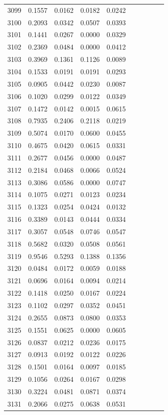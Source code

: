 \begin{table}
\begin{tabular}{cccccccccc}
3099& 0.1557& 0.0162& 0.0182& 0.0242\\ 
3100& 0.2093& 0.0342& 0.0507& 0.0393\\ 
3101& 0.1441& 0.0267& 0.0000& 0.0329\\ 
3102& 0.2369& 0.0484& 0.0000& 0.0412\\ 
3103& 0.3969& 0.1361& 0.1126& 0.0089\\ 
3104& 0.1533& 0.0191& 0.0191& 0.0293\\ 
3105& 0.0905& 0.0442& 0.0230& 0.0087\\ 
3106& 0.1020& 0.0299& 0.0122& 0.0349\\ 
3107& 0.1472& 0.0142& 0.0015& 0.0615\\ 
3108& 0.7935& 0.2406& 0.2118& 0.0219\\ 
3109& 0.5074& 0.0170& 0.0600& 0.0455\\ 
3110& 0.4675& 0.0420& 0.0615& 0.0331\\ 
3111& 0.2677& 0.0456& 0.0000& 0.0487\\ 
3112& 0.2184& 0.0468& 0.0066& 0.0524\\ 
3113& 0.3086& 0.0586& 0.0000& 0.0747\\ 
3114& 0.1075& 0.0271& 0.0123& 0.0234\\ 
3115& 0.1323& 0.0254& 0.0424& 0.0132\\ 
3116& 0.3389& 0.0143& 0.0444& 0.0334\\ 
3117& 0.3057& 0.0548& 0.0746& 0.0547\\ 
3118& 0.5682& 0.0320& 0.0508& 0.0561\\ 
3119& 0.9546& 0.5293& 0.1388& 0.1356\\ 
3120& 0.0484& 0.0172& 0.0059& 0.0188\\ 
3121& 0.0696& 0.0164& 0.0094& 0.0214\\ 
3122& 0.1418& 0.0250& 0.0167& 0.0224\\ 
3123& 0.1102& 0.0297& 0.0352& 0.0451\\ 
3124& 0.2655& 0.0873& 0.0800& 0.0353\\ 
3125& 0.1551& 0.0625& 0.0000& 0.0605\\ 
3126& 0.0837& 0.0212& 0.0236& 0.0175\\ 
3127& 0.0913& 0.0192& 0.0122& 0.0226\\ 
3128& 0.1501& 0.0164& 0.0097& 0.0185\\ 
3129& 0.1056& 0.0264& 0.0167& 0.0298\\ 
3130& 0.3224& 0.0481& 0.0871& 0.0374\\ 
3131& 0.2066& 0.0275& 0.0638& 0.0531\\ 

\end{tabular}
\end{table}
